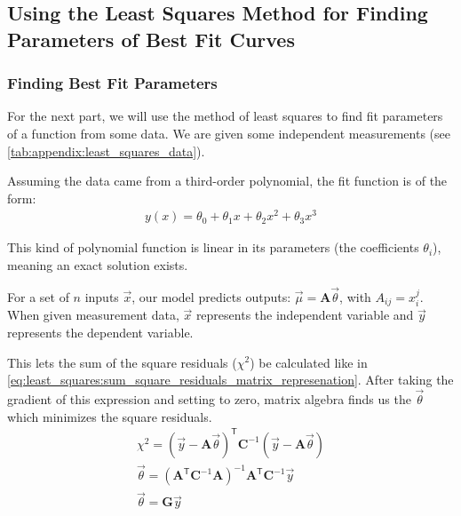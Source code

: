 \subsection{Using the Least Squares Method for Finding Parameters of Best Fit Curves}
\label{sec:least squares}


\subsubsection{Finding Best Fit Parameters}

For the next part, we will use the method of least squares to find fit parameters of a function from some data. We are given some independent measurements (see \autoref{tab:appendix:least_squares_data}).

Assuming the data came from a third-order polynomial, the fit function is of the form:
\begin{gather}
    y(x) = \theta_0 + \theta_1 x + \theta_2 x^2 + \theta_3 x^3
    \label{eq:least_squares:fit_polynomial}
\end{gather}

This kind of polynomial function is linear in its parameters (the coefficients \( \theta_i \)), meaning an exact solution exists.

For a set of \( n \) inputs $\vec{x}$, our model predicts outputs: $ \vec{\mu} = \mathbf{A} \vec{\theta} $, with $ A_{ij} = x_i^j$. When given measurement data, $\vec{x}$ represents the independent variable and $\vec{y}$ represents the dependent variable.

This lets the sum of the square residuals ($\chi^2$) be calculated like in \autoref{eq:least_squares:sum_square_residuals_matrix_represenation}. After taking the gradient of this expression and setting to zero, matrix algebra finds us the $\vec{\theta}$ which minimizes the square residuals.
\begin{gather}
    \chi^2 = (\vec{y} - \mathbf{A}\vec{\theta})^\mathsf{T} \mathbf{C}^{-1} (\vec{y} - \mathbf{A}\vec{\theta})
    \label{eq:least_squares:sum_square_residuals_matrix_represenation} \\
    \vec{\theta} = (\mathbf{A}^\mathsf{T} \mathbf{C}^{-1} \mathbf{A})^{-1} \mathbf{A}^\mathsf{T} \mathbf{C}^{-1} \vec{y} \\
    \vec{\theta} = \mathbf{G} \vec{y}
    \label{eq:least_squares:finding_theta}
\end{gather}

